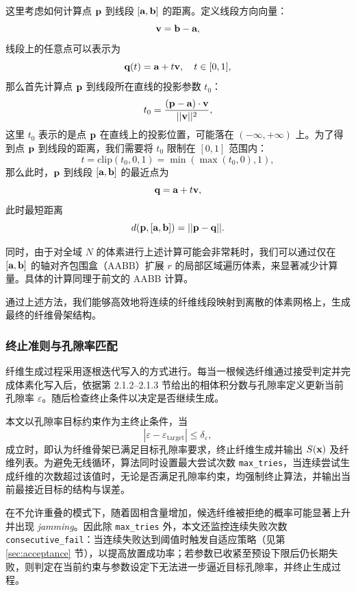 这里考虑如何计算点 $\textbf p$ 到线段 $[\textbf a, \textbf b]$ 的距离。定义线段方向向量：
\begin{equation}
\textbf{v} = \textbf b - \textbf a,
\end{equation}
线段上的任意点可以表示为
\begin{equation}
\textbf{q}(t) = \textbf a + t\textbf v, \quad t \in [0,1],
\end{equation}
那么首先计算点 $\textbf p$ 到线段所在直线的投影参数 $t_0$：
\begin{equation}
t_0 = \dfrac{(\textbf p - \textbf a) \cdot \textbf v}{||\textbf v||^2},
\end{equation}
这里 $t_0$ 表示的是点 $\textbf p$ 在直线上的投影位置，可能落在 $(-\infty, +\infty)$ 上。为了得到点 $\textbf p$ 到线段的距离，我们需要将 $t_0$ 限制在 $[0,1]$ 范围内：
\begin{equation}
t = \text{clip}(t_0, 0, 1) = \min(\max(t_0, 0), 1),
\end{equation}
那么此时，$\textbf p$ 到线段 $[\textbf a, \textbf b]$ 的最近点为
\begin{equation}
\textbf{q} = \textbf a + t\textbf v,
\end{equation}
此时最短距离
\begin{equation}
d(\textbf p, [\textbf a, \textbf b]) = ||\textbf p - \textbf{q}||.
\end{equation}

同时，由于对全域 $N$ 的体素进行上述计算可能会非常耗时，我们可以通过仅在 $[\textbf a, \textbf b]$ 的轴对齐包围盒（AABB）扩展 $r$ 的局部区域遍历体素，来显著减少计算量。具体的计算同理于前文的 AABB 计算。

通过上述方法，我们能够高效地将连续的纤维线段映射到离散的体素网格上，生成最终的纤维骨架结构。

\subsubsection{\textbf{终止准则与孔隙率匹配}}

纤维生成过程采用逐根迭代写入的方式进行。每当一根候选纤维通过接受判定并完成体素化写入后，依据第 2.1.2--2.1.3 节给出的相体积分数与孔隙率定义更新当前孔隙率 $\varepsilon$。随后检查终止条件以决定是否继续生成。

本文以孔隙率目标约束作为主终止条件，当
\begin{equation}
|\varepsilon - \varepsilon_{\mathrm{target}}| \le \delta_\varepsilon,
\end{equation}
成立时，即认为纤维骨架已满足目标孔隙率要求，终止纤维生成并输出 $S(\textbf x)$ 及纤维列表。为避免无线循环，算法同时设置最大尝试次数 \texttt{max\_tries}，当连续尝试生成纤维的次数超过该值时，无论是否满足孔隙率约束，均强制终止算法，并输出当前最接近目标的结构与误差。

在不允许重叠的模式下，随着固相含量增加，候选纤维被拒绝的概率可能显著上升并出现 \emph{jamming}。因此除 \texttt{max\_tries} 外，本文还监控连续失败次数 \texttt{consecutive\_fail}：当连续失败达到阈值时触发自适应策略（见第 \ref{sec:acceptance} 节），以提高放置成功率；若参数已收紧至预设下限后仍长期失败，则判定在当前约束与参数设定下无法进一步逼近目标孔隙率，并终止生成过程。